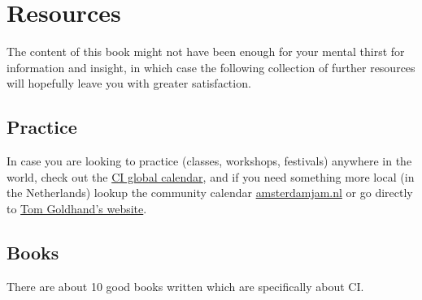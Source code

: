 \chapter{Resources}\label{ch:resources}

The content of this book might not have been enough for your mental thirst for information and insight, in which case the following collection of further resources will hopefully leave you with greater satisfaction.

\section{Practice}\label{sec:practice}

In case you are looking to practice (classes, workshops, festivals) anywhere in the world, check out the \href{https://ciglobalcalendar.net}{CI global calendar}, and if you need something more local (in the Netherlands) lookup the community calendar \href{https://amsterdamjam.nl}{amsterdamjam.nl} or go directly to \href{https://tomgoldhand.com}{Tom Goldhand's website}.

\section{Books}\label{sec:books}

There are about 10 good books written which are specifically about CI\@.

